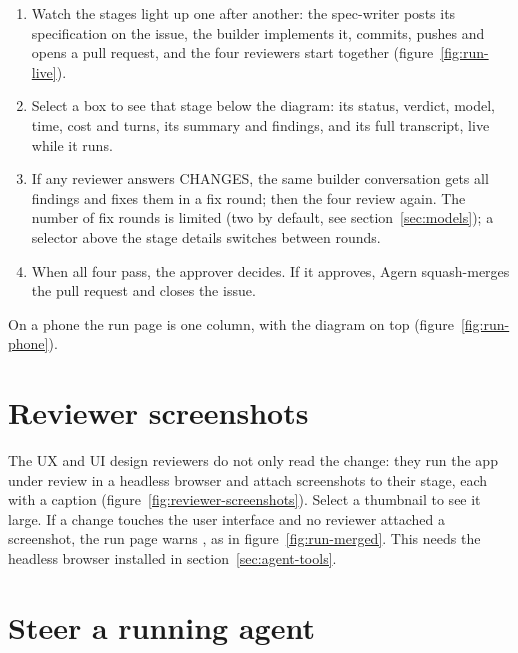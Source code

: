 \begin{enumerate}
  \item Watch the stages light up one after another: the spec-writer posts its specification on the
    issue, the builder implements it, commits, pushes and opens a pull request, and the four
    reviewers start together (figure~\ref{fig:run-live}).
  \item Select a box to see that stage below the diagram: its status, verdict, model, time, cost and
    turns, its summary and findings, and its full transcript, live while it runs.
  \item If any reviewer answers CHANGES, the same builder conversation gets all findings and fixes
    them in a fix round; then the four review again. The number of fix rounds is limited
    (two by default, see section~\ref{sec:models}); a selector above the stage details switches
    between rounds.
  \item When all four pass, the approver decides. If it approves, Agern squash-merges the pull
    request and closes the issue.
\end{enumerate}


On a phone the run page is one column, with the diagram on top (figure~\ref{fig:run-phone}).


\section{Reviewer screenshots}\label{sec:reviewer-screenshots}

The UX and UI design reviewers do not only read the change: they run the app under review in a
headless browser and attach screenshots to their stage, each with a caption
(figure~\ref{fig:reviewer-screenshots}). Select a thumbnail to see it large. If a change touches
the user interface and no reviewer attached a screenshot, the run page warns
, as in figure~\ref{fig:run-merged}. This needs the
headless browser installed in section~\ref{sec:agent-tools}.


\section{Steer a running agent}\label{sec:steer}

